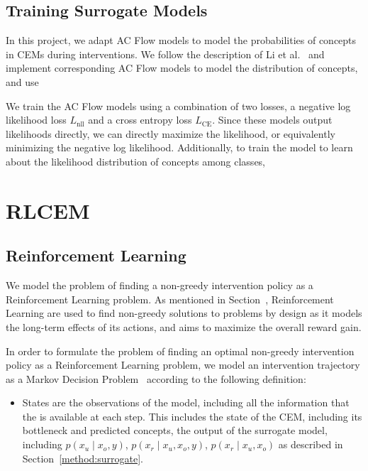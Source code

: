 \documentclass[../main.tex]{subfiles}
\begin{document}
\subsection{Training Surrogate Models}

In this project, we adapt AC Flow models to model the probabilities of concepts in CEMs during interventions.
We follow the description of Li et al.~\cite{afa} and implement corresponding AC Flow models to model
the distribution of concepts, and use 

We train the AC Flow models using a combination of two losses, a negative
log likelihood loss $L_{\text{nll}}$ and a cross entropy loss $L_{\text{CE}}$. 
Since these models output likelihoods directly,
we can directly maximize the likelihood, or equivalently minimizing the negative log likelihood.
Additionally, to train the model to learn about the likelihood distribution of concepts
among classes, 

\section{RLCEM}\label{method:rlcem}


\subsection{Reinforcement Learning}

We model the problem of finding a non-greedy intervention policy as a 
Reinforcement Learning problem. As mentioned in Section~\cite{background:rl},
Reinforcement Learning are used to find non-greedy solutions to problems
by design as it models the long-term effects of its actions, and aims to 
maximize the overall reward gain. 

In order to formulate the problem of finding an optimal non-greedy intervention policy
as a Reinforcement Learning problem, we model an intervention
trajectory as a Markov Decision Problem~\cite{rl-mdp} according
to the following definition:
\begin{itemize}
    \item States are the observations of the model, including all the information that the is available
    at each step. This includes the state of the CEM, including its bottleneck and predicted concepts,
    the output of the surrogate model, including $p(x_u \mid x_o, y)$, $p(x_r \mid x_u, x_o, y)$,
    $p(x_r \mid x_u, x_o)$ as described in Section~\ref{method:surrogate}.
\end{itemize}
\end{document}
